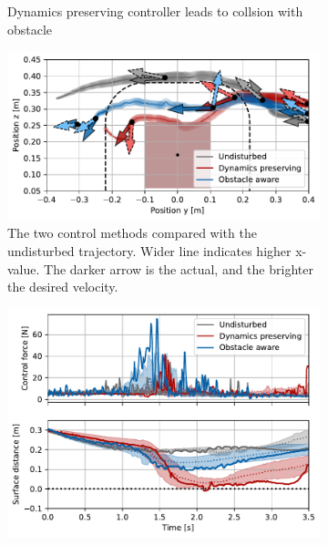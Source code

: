 \begin{figure}
\begin{subfigure}{\columnwidth}
      \caption{Dynamics preserving controller leads to collsion with obstacle}
      \label{fig:franka_sequence_obstacle_aware}
    \end{subfigure}
    \begin{subfigure}{\columnwidth}
      \centerline{\includegraphics[width=\textwidth]{figures/robot_arm_trajectory_xyz}}
      \caption{The two control methods compared with the undisturbed trajectory. Wider line indicates higher x-value. The darker arrow is the actual, and the brighter the desired velocity.}
      \label{fig:robot_arm_trajectory_xyz}
    \end{subfigure}
    \begin{subfigure}{\columnwidth}
		\includegraphics[width=\textwidth]{figures/trajectory_comparison_force_and_distance}

\end{subfigure}
\end{figure}
